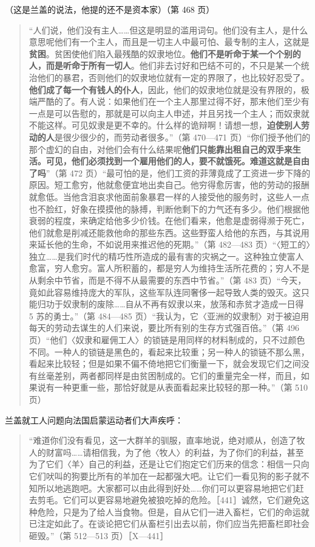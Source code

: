 （这是兰盖的说法，他提的还不是资本家）（第 468 页）

\begin{quote}“人们说，他们没有主人……但这是明显的滥用词句。他们没有主人，是什么意思呢他们有一个主人，而且是一切主人中最可怕、最专制的主人，这就是\textbf{贫困}。贫困使他们陷入最残酷的奴隶地位。\textbf{他们不是听命于某一个个别的人，而是听命于所有一切人}。他们非去讨好和巴结不可的，不只是某一个统治他们的暴君，否则他们的奴隶地位就有一定的界限了，也比较好忍受了。\textbf{他们成了每一个有钱人的仆人}，因此，他们的奴隶地位就是没有界限的，极端严酷的了。有人说：如果他们在一个主人那里过得不好，那末他们至少有一点是可以告慰的，那就是可以向主人申述，并且另找一个主人；而奴隶就不能这样。可见奴隶是更不幸的。什么样的诡辩啊！请想一想，\textbf{迫使别人劳动的人}是很少很少的，而劳动者很多。”（第 470—471 页）“你们授予他们的那个虚幻的自由，对他们会有什么结果呢\textbf{他们只能靠出租自己的双手来生活。可见，他们必须找到一个雇用他们的人，要不就饿死。难道这就是自由了吗}”（第 472 页）“最可怕的是，他们工资的菲薄竟成了工资进一步下降的原因。短工愈穷，他就愈便宜地出卖自己。他穷得愈厉害，他的劳动的报酬就愈低。当他含泪哀求他面前象暴君一样的人接受他的服务时，这些人一点也不脸红，好象在摸摸他的脉搏，判断他剩下的力气还有多少。他们根据他衰弱的程度，来确定给他多少价钱。在他们看来，他愈是虚弱得濒于死亡，他们就愈是削减还能救他命的那些东西。这些野蛮人给他的东西，与其说用来延长他的生命，不如说用来推迟他的死期。”（第 482—483 页）“〈短工的〉独立……是我们时代的精巧性所造成的最有害的灾祸之一。这种独立使富人愈富，穷人愈穷。富人所积蓄的，都是穷人为维持生活所花费的；穷人不是从剩余中节省，而是不得不从最需要的东西中节省。”（第 483 页）“今天，竟如此容易维持庞大的军队，这些军队连同奢侈一起导致人类的毁灭。这只能归功于奴隶制的废除……自从不再有奴隶以来，放荡和赤贫才造成一日得 5 苏的勇士。”（第 484—485 页）“我认为，它〈亚洲的奴隶制〉对于被迫用每天的劳动去谋生的人们来说，要比所有别的生存方式强百倍。”（第 496 页）“他们〈奴隶和雇佣工人〉的锁链是用同样的材料制成的，只不过颜色不同。一种人的锁链是黑色的，看起来比较重；另一种人的锁链不那么黑，看起来比较轻；但是如果不偏不倚地把它们衡量一下，就会发现它们之间没有丝毫差别，两者都同样是由贫困制成的。它们的重量完全一样，而且，如果说有一种更重一些，那恰好就是从表面看起来比较轻的那一种。”（第 510 页）\end{quote}

兰盖就工人问题向法国启蒙运动者们大声疾呼：

\begin{quote}“难道你们没有看见，这一大群羊的驯服，直率地说，绝对顺从，创造了牧人的财富吗……请相信我，为了他〈牧人〉的利益，为了你们的利益，甚至为了它们〈羊〉自己的利益，还是让它们抱定它们历来的信念：相信一只向它们吠叫的狗要比所有的羊加在一起都强大吧。让它们一看见狗的影子就不知所以地逃跑吧。大家都可以由此得到好处……你们可以更容易地把它们赶去剪毛。它们可以更容易地避免被狼吃掉的危险。［441］诚然，它们避免这种危险，只是为了给人当食物。但是，自从它们一进入畜栏，它们的命运就已注定如此了。在谈论把它们从畜栏引出去以前，你们应当先把畜栏即社会砸毁。”（第 512—513 页）［X—441］\end{quote}

